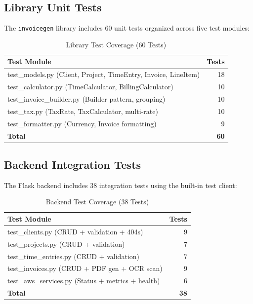 \documentclass[conference]{IEEEtran}
\begin{document}
\subsection{Library Unit Tests}

The \texttt{invoicegen} library includes 60 unit tests organized across five test modules:

\begin{table}[H]
\centering
\caption{Library Test Coverage (60 Tests)}
\begin{tabular}{lr}
\toprule
\textbf{Test Module} & \textbf{Tests} \\
\midrule
test\_models.py (Client, Project, TimeEntry, Invoice, LineItem) & 18 \\
test\_calculator.py (TimeCalculator, BillingCalculator) & 10 \\
test\_invoice\_builder.py (Builder pattern, grouping) & 10 \\
test\_tax.py (TaxRate, TaxCalculator, multi-rate) & 10 \\
test\_formatter.py (Currency, Invoice formatting) & 9 \\
\midrule
\textbf{Total} & \textbf{60} \\
\bottomrule
\end{tabular}
\end{table}

\subsection{Backend Integration Tests}

The Flask backend includes 38 integration tests using the built-in test client:

\begin{table}[H]
\centering
\caption{Backend Test Coverage (38 Tests)}
\begin{tabular}{lr}
\toprule
\textbf{Test Module} & \textbf{Tests} \\
\midrule
test\_clients.py (CRUD + validation + 404s) & 9 \\
test\_projects.py (CRUD + validation) & 7 \\
test\_time\_entries.py (CRUD + validation) & 7 \\
test\_invoices.py (CRUD + PDF gen + OCR scan) & 9 \\
test\_aws\_services.py (Status + metrics + health) & 6 \\
\midrule
\textbf{Total} & \textbf{38} \\
\bottomrule
\end{tabular}
\end{table}
\end{document}
